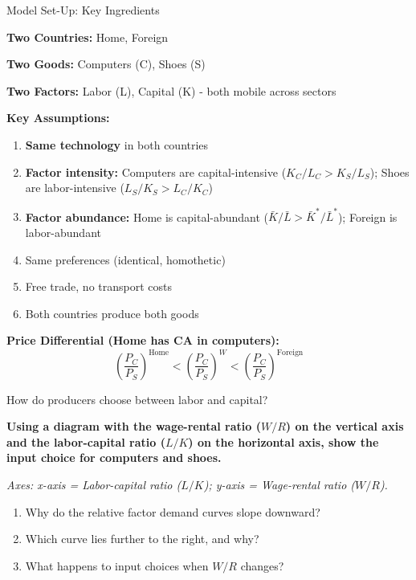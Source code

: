 \documentclass{beamer}
\begin{document}
\begin{frame}{Model Set-Up: Key Ingredients}

\textbf{Two Countries:} Home, Foreign

\textbf{Two Goods:} Computers (C), Shoes (S)

\textbf{Two Factors:} Labor (L), Capital (K) - both mobile across sectors

\vspace{0.3cm}

\textbf{Key Assumptions:}
\begin{enumerate}
    \item \textbf{Same technology} in both countries
    \item \textbf{Factor intensity:} Computers are capital-intensive ($K_C/L_C > K_S/L_S$); Shoes are labor-intensive ($L_S/K_S > L_C/K_C$)
    \item \textbf{Factor abundance:} Home is capital-abundant ($\bar{K}/\bar{L} > \bar{K}^*/\bar{L}^*$); Foreign is labor-abundant
    \item Same preferences (identical, homothetic)
    \item Free trade, no transport costs
    \item Both countries produce both goods
\end{enumerate}

\vspace{0.3cm}

\textbf{Price Differential (Home has CA in computers):}
$$\left(\frac{P_C}{P_S}\right)^{\text{Home}} < \left(\frac{P_C}{P_S}\right)^{W} < \left(\frac{P_C}{P_S}\right)^{\text{Foreign}}$$

\end{frame}

\begin{frame}{How do producers choose between labor and capital?}

\textbf{Using a diagram with the wage-rental ratio ($W/R$) on the vertical axis and the labor-capital ratio ($L/K$) on the horizontal axis, show the input choice for computers and shoes.}

\vspace{0.2cm}

\textit{Axes: x-axis = Labor-capital ratio ($L/K$); y-axis = Wage-rental ratio ($W/R$).}

\vspace{0.3cm}

\begin{enumerate}
    \item Why do the relative factor demand curves slope downward?
    \item Which curve lies further to the right, and why?
    \item What happens to input choices when $W/R$ changes?
\end{enumerate}

\end{frame}
\end{document}
